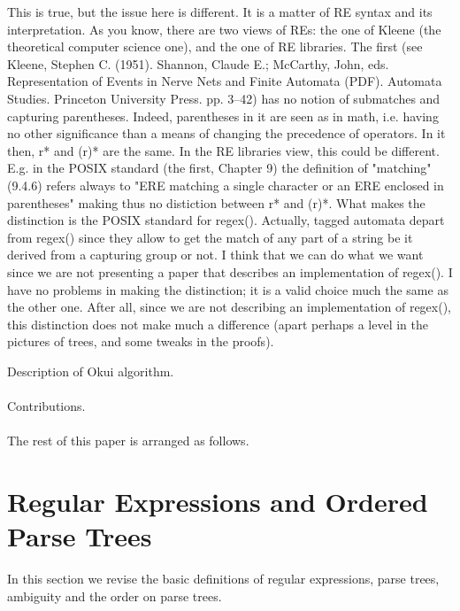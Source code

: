 \documentclass[AMA,STIX1COL]{WileyNJD-v2}
\begin{document}
This is true, but the issue here is different. It is a matter of RE syntax and its interpretation.
As you know, there are two views of REs: the one of Kleene (the theoretical computer science one), and the
one of RE libraries. The first  (see Kleene, Stephen C. (1951). Shannon, Claude E.; McCarthy, John, eds.
Representation of Events in Nerve Nets and Finite Automata (PDF). Automata Studies. Princeton University
Press. pp. 3–42) has no notion of submatches and capturing parentheses. Indeed, parentheses in it
are seen as in math, i.e. having no other significance than a means of changing the precedence of
operators. In it then, r* and (r)* are the same.
In the RE libraries view, this could be different. E.g. in the POSIX standard (the first, Chapter 9) the definition
of "matching" (9.4.6) refers always to "ERE matching a single character or an ERE enclosed in parentheses"
making thus no distiction between r* and (r)*. What makes the distinction is the POSIX standard for regex().
Actually, tagged automata depart from regex() since they allow to get the match of any part of a string be it
derived from a capturing group or not.
I think that we can do what we want since we are not presenting a paper that describes an implementation of
regex(). I have no problems in making the distinction; it is a valid choice much the same as the other one.
After all, since we are not describing an implementation of regex(), this distinction does not make much
a difference (apart perhaps a level in the pictures of trees, and some tweaks in the proofs).

\fi

Description of Okui algorithm.
\\ \\
Contributions.
\\ \\
The rest of this paper is arranged as follows.

\section{Regular Expressions and Ordered Parse Trees}

In this section we revise the basic definitions of
regular expressions,
parse trees,
ambiguity
and the order on parse trees.
\end{document}
